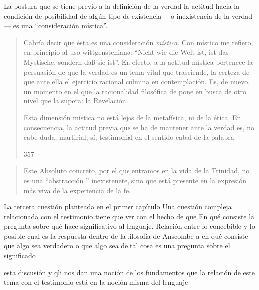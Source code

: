 La postura que se tiene previo a la definición de la verdad la actitud hacia la condición de posibilidad de algún tipo de existencia ---o inexistencia de la verdad--- es una ``consideración mística''. 

\blockquote[357]{Cabría decir que ésta es una consideración \emph{mística}. Con místico me refiero, en principio al uso wittgensteniano: ``Nicht wie die Welt ist, ist das Mystische, sondern daß sie ist''. En efecto, a la actitud mística pertenece la persuasión de que la verdad es un tema vital que trasciende, la certeza de que ante ella el ejercicio racional culmina en contemplación. Es, de nuevo, un momento en el que la racionalidad filosófica de pone en busca de otro nivel que la supera: la Revelación.

Esta dimensión mistica no está lejos de la metafísica, ni de la ética. \textelp{} En consecuencia, la actitud previa que se ha de mantener ante la verdad es, no cabe duda, martirial; sí, testimonial en el sentido cabal de la palabra}.

\blockquote[{\Cite[410-411]{dominguez2009at}}]{Este Absoluto concreto, por el que entramos en la vida de la Trinidad, no es una ``abstracción '' inexistenete, sino que está presente en la expresión más viva de la experiencia de la fe.}

La tercera cuestión planteada en el primer capítulo 
Una cuestión compleja relacionada con el testimonio tiene que ver con el hecho de que En qué consiste la pregunta sobre qué hace significativo al lenguaje.
Relación entre lo concebible y lo posible
cual es la respuesta dentro de la filosofía de Anscombe
a en qué consiste que algo sea verdadero o que algo sea de tal cosa
es una pregunta sobre el significado

esta discusión y qli nos dan una noción de los fundamentos que 
la relación de este tema con el testimonio está en la noción misma del lenguaje
